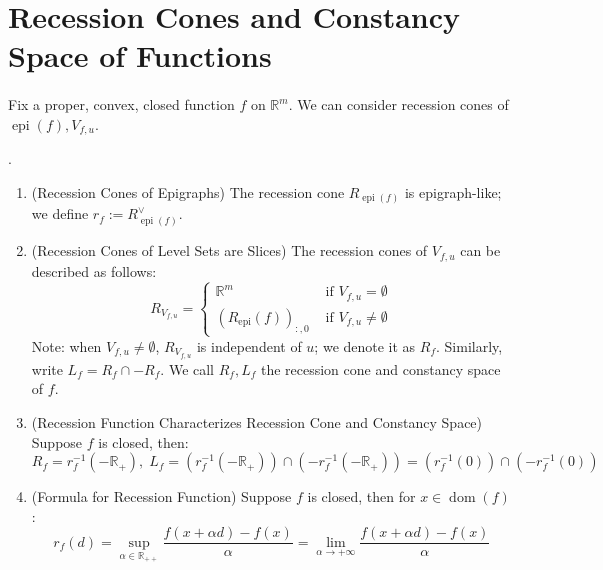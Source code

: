 \section{Recession Cones and Constancy Space of Functions}
\label{sect:024}

\paragraph{}Fix a proper, convex, closed function $f$ on $\mathbb{R}^m$. We can consider recession cones of $\operatorname{epi}(f),V_{f,u}$.

\begin{prop}\label{prop:024-recess-epi-level}
	.
	\begin{enumerate}[label=(\alph*)]
		\item (Recession Cones of Epigraphs) The recession cone $R_{\operatorname{epi}(f)}$ is epigraph-like; we define $r_f:=R_{\operatorname{epi}(f)}^\vee$.
		\item (Recession Cones of Level Sets are Slices) The recession cones of $V_{f,u}$ can be described as follows:
		      \[
			      R_{V_{f,u}}=\begin{cases}
				      \mathbb{R}^m                                 & \text{ if }V_{f,u}=\emptyset    \\
				      \left(R_{\operatorname{epi}}(f)\right)_{:,0} & \text{ if }V_{f,u}\neq\emptyset
			      \end{cases}
		      \]
		      Note: when $V_{f,u}\neq\emptyset$, $R_{V_{f,u}}$ is independent of $u$; we denote it as $R_f$. Similarly, write $L_{f}=R_f\cap -R_f$. We call $R_f,L_f$ the recession cone and constancy space of $f$.
		\item (Recession Function Characterizes Recession Cone and Constancy Space) Suppose $f$ is closed, then:
		      \[
			      R_f=r_f^{-1}\left(-\mathbb{R}_{+}\right),\;
			      L_f=\left(r_f^{-1}\left(-\mathbb{R}_{+}\right)\right)\cap\left(-r_f^{-1}(-\mathbb{R}_{+})\right)=\left(r_f^{-1}(0)\right)\cap\left(-r_f^{-1}(0)\right)
		      \]
		\item (Formula for Recession Function) Suppose $f$ is closed, then for $x\in \operatorname{dom}(f)$:
		      \[
			      r_f(d)=\underset{\alpha\in \mathbb{R}_{++}}{\operatorname{sup}}\frac{f(x+\alpha d)-f(x)}{\alpha }
			      =\lim_{\alpha \to+\infty}\frac{f(x+\alpha d)-f(x)}{\alpha }
		      \]
	\end{enumerate}
\end{prop}

